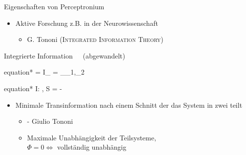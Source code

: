 \begin{frame}{Eigenschaften von Perceptronium}
	\begin{itemize}
		\item{Aktive Forschung z.B. in der Neurowissenschaft}
		\begin{itemize}
			\item{G. Tononi (\textsc{Integrated Information Theory})\,\cite{Tononi_08}}
  		\end{itemize}
	\end{itemize}
	\begin{beamerboxesrounded}{Integrierte Information $\textcolor{white}{\Phi}$ (abgewandelt)}
		\begin{empheq}{equation*}
			\Phi = I_{} = \min_{\rho_1,\rho_2} \del{S(\rho_{1}) + S(\rho_{2}) - S(\rho)}
		\end{empheq}
		\vspace{-0.5cm}
		\begin{empheq}{equation*}
			\small I: , S = - 
		\end{empheq}
		\vspace{-0.5cm}
	\end{beamerboxesrounded}
	\begin{itemize}
		\item{Minimale Transinformation nach einem Schnitt der das System in zwei teilt}
			\begin{itemize}
				\item{ - Giulio Tononi}
				\item{Maximale Unabhängigkeit der Teilsysteme,\\ $\Phi = 0 \Leftrightarrow$ vollständig unabhängig}
			\end{itemize}
	\end{itemize}
\end{frame}
